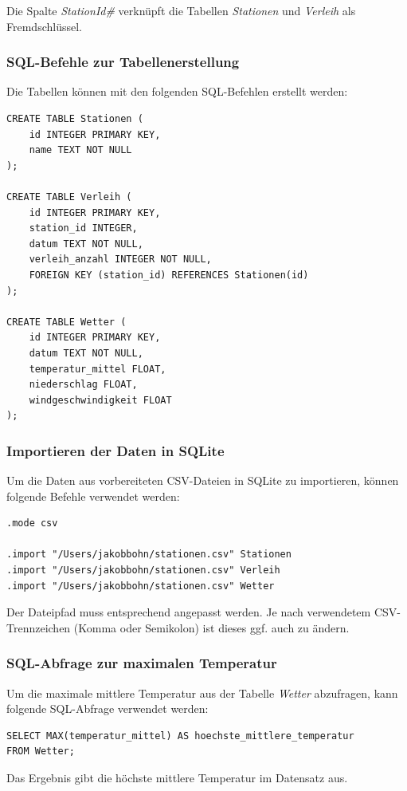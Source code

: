 \documentclass[a4paper,12pt]{article}
\begin{document}
Die Spalte \textit{StationId\#} verknüpft die Tabellen \textit{Stationen} und \textit{Verleih} als Fremdschlüssel.

\subsubsection{SQL-Befehle zur Tabellenerstellung}
Die Tabellen können mit den folgenden SQL-Befehlen erstellt werden:
\begin{verbatim}
CREATE TABLE Stationen (
    id INTEGER PRIMARY KEY,
    name TEXT NOT NULL
);

CREATE TABLE Verleih (
    id INTEGER PRIMARY KEY,
    station_id INTEGER,
    datum TEXT NOT NULL,
    verleih_anzahl INTEGER NOT NULL,
    FOREIGN KEY (station_id) REFERENCES Stationen(id)
);

CREATE TABLE Wetter (
    id INTEGER PRIMARY KEY,
    datum TEXT NOT NULL,
    temperatur_mittel FLOAT,
    niederschlag FLOAT,
    windgeschwindigkeit FLOAT
);
\end{verbatim}

\subsubsection{Importieren der Daten in SQLite}
Um die Daten aus vorbereiteten CSV-Dateien in SQLite zu importieren, können folgende Befehle verwendet werden:

\begin{verbatim}
.mode csv

.import "/Users/jakobbohn/stationen.csv" Stationen
.import "/Users/jakobbohn/stationen.csv" Verleih
.import "/Users/jakobbohn/stationen.csv" Wetter
\end{verbatim}

Der Dateipfad muss entsprechend angepasst werden. Je nach verwendetem CSV-Trennzeichen (Komma oder Semikolon) ist dieses ggf. auch zu ändern.

\subsubsection{SQL-Abfrage zur maximalen Temperatur}
Um die maximale mittlere Temperatur aus der Tabelle \textit{Wetter} abzufragen, kann folgende SQL-Abfrage verwendet werden:
\begin{verbatim}
SELECT MAX(temperatur_mittel) AS hoechste_mittlere_temperatur
FROM Wetter;
\end{verbatim}
Das Ergebnis gibt die höchste mittlere Temperatur im Datensatz aus.
\end{document}
